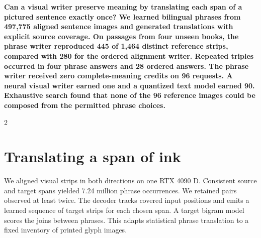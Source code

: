 \noindent\textbf{Can a visual writer preserve meaning by translating each span of a pictured sentence exactly once? We learned bilingual phrases from 497,775 aligned sentence images and generated translations with explicit source coverage. On passages from four unseen books, the phrase writer reproduced 445 of 1,464 distinct reference strips, compared with 280 for the ordered alignment writer. Repeated triples occurred in four phrase answers and 28 ordered answers. The phrase writer received zero complete-meaning credits on 96 requests. A neural visual writer earned one and a quantized text model earned 90. Exhaustive search found that none of the 96 reference images could be composed from the permitted phrase choices.}\par
\begin{multicols}{2}
\section*{Translating a span of ink}
We aligned visual strips in both directions on one RTX 4090 D. Consistent source and target spans yielded 7.24 million phrase occurrences. We retained pairs observed at least twice. The decoder tracks covered input positions and emits a learned sequence of target strips for each chosen span. A target bigram model scores the joins between phrases. This adapts statistical phrase translation to a fixed inventory of printed glyph images.\cite{koehn}
\end{multicols}
